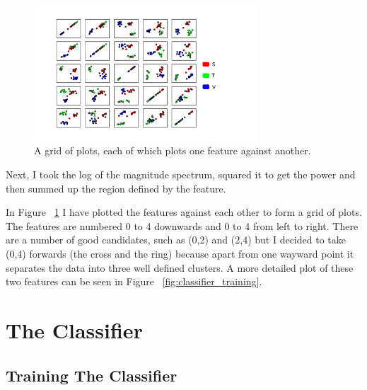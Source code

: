 \documentclass[11pt, a4paper]{article}
\begin{document}
\begin{figure}[ht]
	\centering
	\includegraphics[trim={0 1.5cm 3cm 1.5cm},clip,width=0.75\textwidth]{feature_matrix_leg.png}
	\caption{A grid of plots, each of which plots one feature against another.}
	\label{fig:feature_matrix}
\end{figure}

Next, I took the log of the magnitude spectrum, squared it to get the power and then summed up the region defined by the feature.

In Figure ~\ref{fig:feature_matrix} I have plotted the features against each other to form a grid of plots. The features are numbered 0 to 4 downwards and 0 to 4 from left to right. There are a number of good candidates, such as (0,2) and (2,4) but I decided to take (0,4) forwards (the cross and the ring) because apart from one wayward point it separates the data into three well defined clusters. A more detailed plot of these two features can be seen in Figure ~\ref{fig:classifier_training}.




\section{The Classifier}
\subsection{Training The Classifier}
\end{document}
